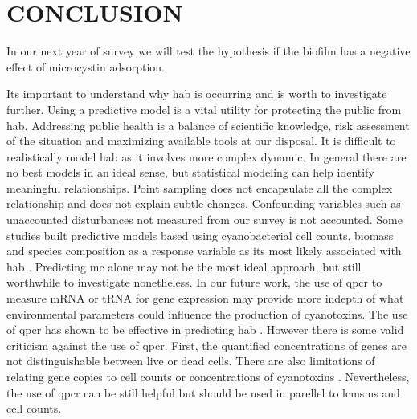 \chapter{CONCLUSION}

In our next year of survey we will test the hypothesis if the biofilm has a negative effect of microcystin adsorption.

Its important to understand why \gls{hab} is occurring and is worth to investigate further. Using a predictive model is a vital utility for protecting the public from \gls{hab}. Addressing public health is a balance of scientific knowledge, risk assessment of the situation and maximizing available tools at our disposal. It is difficult to realistically model \gls{hab} as it involves more complex dynamic. In general there are no best models in an ideal sense, but statistical modeling can help identify meaningful relationships. Point sampling does not encapsulate all the complex relationship and does not explain subtle changes. Confounding variables such as unaccounted disturbances not measured from our survey is not accounted. Some studies built predictive models based using cyanobacterial cell counts, biomass and species composition as a response variable as its most likely associated with \gls{hab} \cite{moore_richard_cyanobacterial_1993, ahn_evaluation_2011, jiang_statistical_2008, beaulieu_nutrients_2013, taranu_predicting_2017}. Predicting \gls{mc} alone may not be the most ideal approach, but still worthwhile to investigate nonetheless. In our future work, the use of \gls{qpcr} to measure mRNA or tRNA for gene expression may provide more indepth of what environmental parameters could influence the production of cyanotoxins. The use of \gls{qpcr} has shown to be effective in predicting \gls{hab} \cite{wilson_genetic_2005}. However there is some valid criticism against the use of \gls{qpcr}. First, the quantified concentrations of genes are not distinguishable between live or dead cells. There are also limitations of relating gene copies to cell counts or concentrations of cyanotoxins \cite{pacheco_is_2016}. Nevertheless, the use of \gls{qpcr} can be still helpful but should be used in parellel to \gls{lcmsms} and cell counts.






